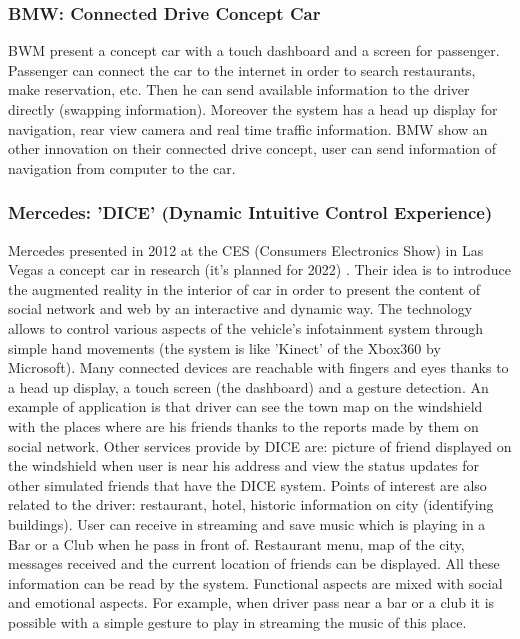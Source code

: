 \documentclass[a4paper]{article}
\begin{document}
\subsubsection{BMW: Connected Drive Concept Car}

BWM \cite{BMWConnected} present a concept car with a touch dashboard and a screen for passenger. Passenger can connect the car to the internet in order to search restaurants, make reservation, etc. Then he can send available information to the driver directly (swapping information). Moreover the system has a head up display for navigation, rear view camera and real time traffic information. BMW show an other innovation on their connected drive concept, user can send information of navigation from computer to the car.

\newpage

\subsubsection{Mercedes: 'DICE' (Dynamic Intuitive Control Experience)}

Mercedes presented in 2012 at the CES (Consumers Electronics Show) in Las Vegas a concept car in research (it's planned for 2022) \cite{DICE}. Their idea is to introduce the augmented reality in the interior of car in order to present the content of social network and web by an interactive and dynamic way. The technology allows to control various aspects of the vehicle's infotainment system through simple hand movements (the system is like 'Kinect' of the Xbox360 by Microsoft). Many connected devices are reachable with fingers and eyes thanks to a head up display, a touch screen (the dashboard) and a gesture detection. An example of application is that driver can see the town map on the windshield with the places where are his friends thanks to the reports made by them on social network. Other services provide by DICE are: picture of friend displayed on the windshield when user is near his address and view the status updates for other simulated friends that have the DICE system. Points of interest are also related to the driver: restaurant, hotel, historic information on city (identifying buildings). User can receive in streaming and save music which is playing in a Bar or a Club when he pass in front of. Restaurant menu, map of the city, messages received and the current location of friends can be displayed. All these information can be read by the system. Functional aspects are mixed with social and emotional aspects. For example, when driver pass near a bar or a club it is possible with a simple gesture to play in streaming the music of this place.
\end{document}
